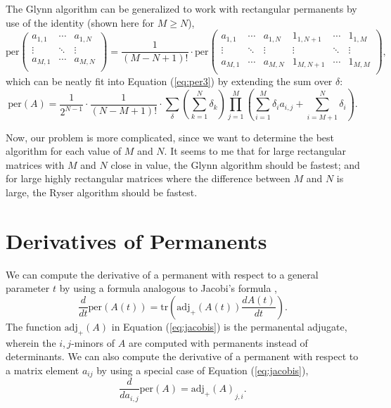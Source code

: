 \documentclass{article}
\begin{document}
The Glynn algorithm can be generalized to work with rectangular permanents by use of the identity
(shown here for $M \geq N$),
\begin{equation} \label{eq:padidentity}
    {\text{per}}\left(
        \begin{matrix}
            a_{1,1} & \cdots & a_{1,N} \\
            \vdots & \ddots & \vdots \\
            a_{M,1} & \cdots & a_{M,N} \\
        \end{matrix}
    \right)
    = \frac{1}{\left(M - N + 1\right)!} \cdot {\text{per}}\left(
        \begin{matrix}
            a_{1,1} & \cdots & a_{1,N} & 1_{1,N+1} & \cdots & 1_{1,M} \\
            \vdots & \ddots & \vdots & \vdots & \ddots & \vdots \\
            a_{M,1} & \cdots & a_{M,N} & 1_{M,N+1} & \cdots & 1_{M,M} \\
        \end{matrix}
    \right),
\end{equation}
which can be neatly fit into Equation (\ref{eq:per3}) by extending the sum over $\delta$:
\begin{equation} \label{eq:rectper3}
    \text{per}(A) = \frac{1}{2^{N-1}} \cdot \frac{1}{\left(N - M + 1\right)!} \cdot \sum_{\delta}{
        \left(\sum_{k=1}^N{\delta_k}\right)
        \prod_{j=1}^M{\left(\sum_{i=1}^M{\delta_i a_{i,j}} + \sum_{i=M+1}^N{\delta_i}\right)}
    }.
\end{equation}

Now, our problem is more complicated, since we want to determine the best algorithm for each value
of $M$ and $N$. It seems to me that for large rectangular matrices with $M$ and $N$ close in value,
the Glynn algorithm should be fastest; and for large highly rectangular matrices where the
difference between $M$ and $N$ is large, the Ryser algorithm should be fastest.

\section*{Derivatives of Permanents}

We can compute the derivative of a permanent with respect to a general parameter $t$ by using
a formula analogous to Jacobi's formula \cite{carvalho2014},
\begin{equation} \label{eq:jacobis}
    \frac{d}{dt}\text{per}(A(t)) = \text{tr}\left(\text{adj}_{+}(A(t))\frac{dA(t)}{dt}\right).
\end{equation}
The function $\text{adj}_{+}(A)$ in Equation (\ref{eq:jacobis}) is the permanental adjugate, wherein
the $i,j$-minors of $A$ are computed with permanents instead of determinants. We can also compute
the derivative of a permanent with respect to a matrix element $a_{ij}$ by using a special case of
Equation (\ref{eq:jacobis}),
\begin{equation}
    \frac{d}{d{a_{i,j}}}\text{per}(A) = {\text{adj}_{+}(A)}_{j,i}.
\end{equation}

\pagebreak



\end{document}
